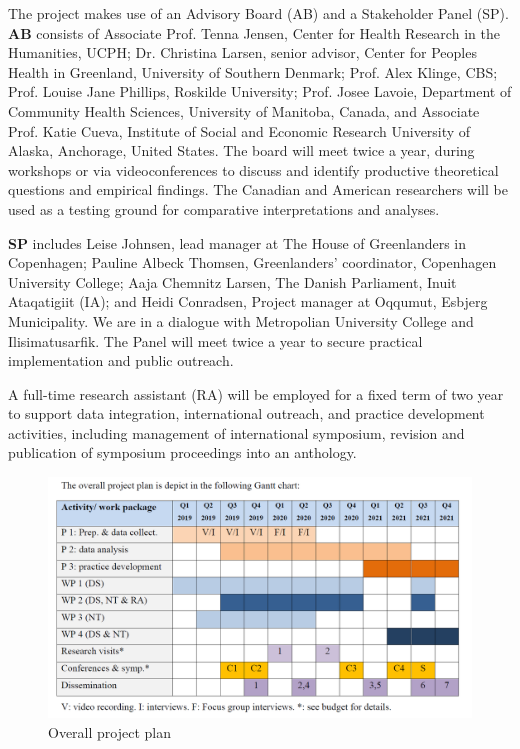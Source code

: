 \documentclass[twocolumn, serif, rga, authordate]{jote-article}
\begin{document}
The project makes use of an Advisory Board (AB) and a Stakeholder Panel
(SP). \textbf{AB} consists of Associate Prof. Tenna Jensen, Center for Health Research in the Humanities, UCPH; Dr. Christina Larsen, senior advisor, Center for Peoples Health in Greenland, University of Southern Denmark; Prof. Alex Klinge, CBS; Prof. Louise Jane Phillips, Roskilde University; Prof. Josee Lavoie, Department of Community Health Sciences, University of Manitoba, Canada, and Associate Prof. Katie Cueva, Institute of Social and Economic Research University of Alaska, Anchorage, United States. The board will meet twice a year, during workshops or via videoconferences to discuss and identify productive theoretical questions and empirical findings. The Canadian and American researchers will be used as a testing ground for comparative interpretations and analyses.

\textbf{SP} includes Leise Johnsen, lead manager at The House of Greenlanders in Copenhagen; Pauline Albeck Thomsen, Greenlanders'
coordinator, Copenhagen University College; Aaja Chemnitz Larsen, The Danish Parliament, Inuit Ataqatigiit (IA); and Heidi Conradsen, Project manager at Oqqumut, Esbjerg Municipality. We are in a dialogue with Metropolian University College and Ilisimatusarfik. The Panel will meet twice a year to secure practical implementation and public outreach.

A full-time research assistant (RA) will be employed for a fixed term of two year to support data integration, international outreach, and practice development activities, including management of international symposium, revision and publication of symposium proceedings into an anthology.

\begin{figure}
\includegraphics[width=\linewidth]{articles/RGAs/schwalbe/media/image1.png}
\caption{Overall project plan}

\end{figure}
\end{document}
